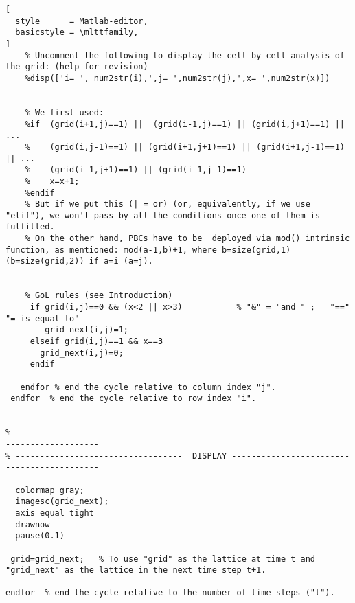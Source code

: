\documentclass[11pt]{article}
\numberwithin{equation}{section} %
\numberwithin{figure}{section} %
\begin{document}
\begin{appendices}
\begin{lstlisting}[
  style      = Matlab-editor,
  basicstyle = \mlttfamily,
]
    % Uncomment the following to display the cell by cell analysis of the grid: (help for revision)
    %disp(['i= ', num2str(i),',j= ',num2str(j),',x= ',num2str(x)])
    
    
    % We first used:
    %if  (grid(i+1,j)==1) ||  (grid(i-1,j)==1) || (grid(i,j+1)==1) || ...       
    %    (grid(i,j-1)==1) || (grid(i+1,j+1)==1) || (grid(i+1,j-1)==1) || ...
    %    (grid(i-1,j+1)==1) || (grid(i-1,j-1)==1) 
    %    x=x+1;
    %endif  
    % But if we put this (| = or) (or, equivalently, if we use "elif"), we won't pass by all the conditions once one of them is fulfilled.
    % On the other hand, PBCs have to be  deployed via mod() intrinsic function, as mentioned: mod(a-1,b)+1, where b=size(grid,1) (b=size(grid,2)) if a=i (a=j).
     

    % GoL rules (see Introduction)
     if grid(i,j)==0 && (x<2 || x>3)           % "&" = "and " ;   "==" "= is equal to"
        grid_next(i,j)=1;   
     elseif grid(i,j)==1 && x==3
       grid_next(i,j)=0;    
     endif
 
   endfor % end the cycle relative to column index "j".                 
 endfor  % end the cycle relative to row index "i".

 
% ---------------------------------------------------------------------------------------
% ----------------------------------  DISPLAY ------------------------------------------- 
                      
  colormap gray;       
  imagesc(grid_next);
  axis equal tight     
  drawnow                    
  pause(0.1)  
 
 grid=grid_next;   % To use "grid" as the lattice at time t and "grid_next" as the lattice in the next time step t+1.
                    
endfor  % end the cycle relative to the number of time steps ("t").

\end{lstlisting}




\newpage
\section{} \label{Appendix_B}


\end{appendices}
\end{document}

